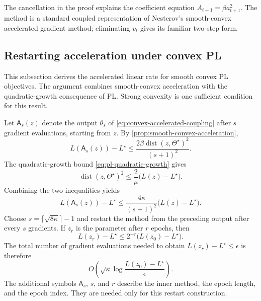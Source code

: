 \documentclass[11pt,twoside]{article}
\theoremstyle{definition}
\theoremstyle{remark}
\begin{document}
The cancellation in the proof explains the coefficient equation
$A_{t+1}=\beta a_{t+1}^2$. The method is a standard coupled representation of
Nesterov's smooth-convex accelerated gradient method; eliminating $v_t$ gives
its familiar two-step form.

\subsection{Restarting acceleration under convex PL}
\label{sec:restart-optional}

This subsection derives the accelerated linear rate for smooth convex PL
objectives. The argument combines smooth-convex acceleration with the
quadratic-growth consequence of PL. Strong convexity is one sufficient
condition for this result.

Let $\mathsf A_s(z)$ denote the output $\theta_s$ of
\cref{eq:convex-accelerated-coupling} after $s$ gradient evaluations, starting
from $z$. By \cref{prop:smooth-convex-acceleration},
\begin{equation}
 L(\mathsf A_s(z))-L^\star
 \le\frac{2\beta\operatorname{dist}(z,\Theta^\star)^2}{(s+1)^2}.
 \label{eq:accelerated-convex-rate}
\end{equation}
The quadratic-growth bound \cref{eq:pl-quadratic-growth} gives
\begin{equation}
 \operatorname{dist}(z,\Theta^\star)^2
 \le\frac2\mu\bigl(L(z)-L^\star\bigr).
 \label{eq:quadratic-growth-distance-gap}
\end{equation}
Combining the two inequalities yields
\begin{equation}
 L(\mathsf A_s(z))-L^\star
 \le\frac{4\kappa}{(s+1)^2}
       \bigl(L(z)-L^\star\bigr).
 \label{eq:accelerated-restart-one-epoch}
\end{equation}
Choose $s=\lceil\sqrt{8\kappa}\rceil-1$ and restart the method from the
preceding output after every $s$ gradients. If $z_r$ is the parameter after
$r$ epochs, then
\begin{equation}
 L(z_r)-L^\star
 \le 2^{-r}\bigl(L(z_0)-L^\star\bigr).
 \label{eq:accelerated-restart-linear-rate}
\end{equation}
The total number of gradient evaluations needed to obtain
$L(z_r)-L^\star\le\epsilon$ is therefore
\begin{equation}
 O\left(\sqrt\kappa
 \log\frac{L(z_0)-L^\star}{\epsilon}\right).
 \label{eq:accelerated-restart-complexity}
\end{equation}
The additional symbols $\mathsf A_s$, $s$, and $r$ describe the inner method,
the epoch length, and the epoch index. They are needed only for this restart
construction.
\end{document}
